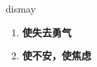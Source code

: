 
\begin{frame}
{\huge dismay}
\begin{center}
\begin{enumerate}\Large
  \item \textbf{使失去勇气}
  \item \textbf{使不安，使焦虑}
\end{enumerate}
\end{center}
\end{frame}

